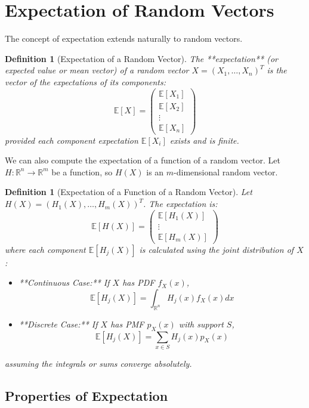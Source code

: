 \documentclass[11pt]{article}
\newtheorem{definition}[theorem]{Definition}
\theoremstyle{definition} %
\newcommand{\R}{\mathbb{R}} %
\newcommand{\E}{\mathbb{E}} %
\begin{document}
\section{Expectation of Random Vectors}

The concept of expectation extends naturally to random vectors.

\begin{definition}[Expectation of a Random Vector]
The **expectation** (or expected value or mean vector) of a random vector $X = (X_1, \dots, X_n)^T$ is the vector of the expectations of its components:
\[ \E[X] = \begin{pmatrix} \E[X_1] \\ \E[X_2] \\ \vdots \\ \E[X_n] \end{pmatrix} \]
provided each component expectation $\E[X_i]$ exists and is finite.
\end{definition}

We can also compute the expectation of a function of a random vector. Let $H: \R^n \to \R^m$ be a function, so $H(X)$ is an $m$-dimensional random vector.

\begin{definition}[Expectation of a Function of a Random Vector]
Let $H(X) = (H_1(X), \dots, H_m(X))^T$. The expectation is:
\[ \E[H(X)] = \begin{pmatrix} \E[H_1(X)] \\ \vdots \\ \E[H_m(X)] \end{pmatrix} \]
where each component $\E[H_j(X)]$ is calculated using the joint distribution of $X$:
\begin{itemize}
    \item **Continuous Case:** If $X$ has PDF $f_X(x)$,
    \[ \E[H_j(X)] = \int_{\R^n} H_j(x) f_X(x) dx \]
    \item **Discrete Case:** If $X$ has PMF $p_X(x)$ with support $S$,
    \[ \E[H_j(X)] = \sum_{x \in S} H_j(x) p_X(x) \]
\end{itemize}
assuming the integrals or sums converge absolutely.
\end{definition}

\subsection{Properties of Expectation}
\end{document}
